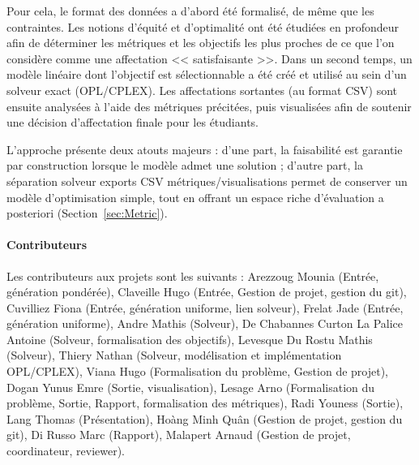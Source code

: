 \documentclass{rapport}
\theoremstyle{definition}
\theoremstyle{remark}
\theoremstyle{plain}
\theoremstyle{definition}
\theoremstyle{definition}
\theoremstyle{remark}
\theoremstyle{definition}
\begin{document}
Pour cela, le format des données a d'abord été formalisé, de même que les contraintes. Les notions d'équité et d'optimalité ont été étudiées en profondeur afin de déterminer les métriques et les objectifs les plus proches de ce que l'on considère comme une affectation << satisfaisante >>.
Dans un second temps, un modèle linéaire dont l'objectif est sélectionnable a été créé et utilisé au sein d'un solveur exact (OPL/CPLEX). Les affectations sortantes (au format CSV) sont ensuite analysées à l'aide des métriques précitées, puis visualisées afin de soutenir une décision d'affectation finale pour les étudiants.

L'approche présente deux atouts majeurs : d'une part, la faisabilité est garantie par construction lorsque le modèle admet une solution ; d'autre part, la séparation \og solveur \textrightarrow{} exports CSV \textrightarrow{} métriques/visualisations \fg{} permet de conserver un modèle d'optimisation simple, tout en offrant un espace riche d'évaluation a posteriori (Section~\ref{sec:Metric}).

\paragraph{Contributeurs} Les contributeurs aux projets sont les suivants :
Arezzoug Mounia (Entrée, génération pondérée),
Claveille Hugo (Entrée, Gestion de projet, gestion du git),
Cuvilliez Fiona (Entrée, génération uniforme, lien solveur),
Frelat Jade (Entrée, génération uniforme),
Andre Mathis (Solveur),
De Chabannes Curton La Palice Antoine (Solveur, formalisation des objectifs),
Levesque Du Rostu Mathis (Solveur),
Thiery Nathan (Solveur, modélisation et implémentation OPL/CPLEX),
Viana Hugo (Formalisation du problème, Gestion de projet),
Dogan Yunus Emre (Sortie, visualisation),
Lesage Arno (Formalisation du problème, Sortie, Rapport, formalisation des métriques),
Radi Youness (Sortie),
Lang Thomas (Présentation),
Hoàng Minh Quân (Gestion de projet, gestion du git),
Di Russo Marc (Rapport),
Malapert Arnaud (Gestion de projet, coordinateur, reviewer).



\end{document}
